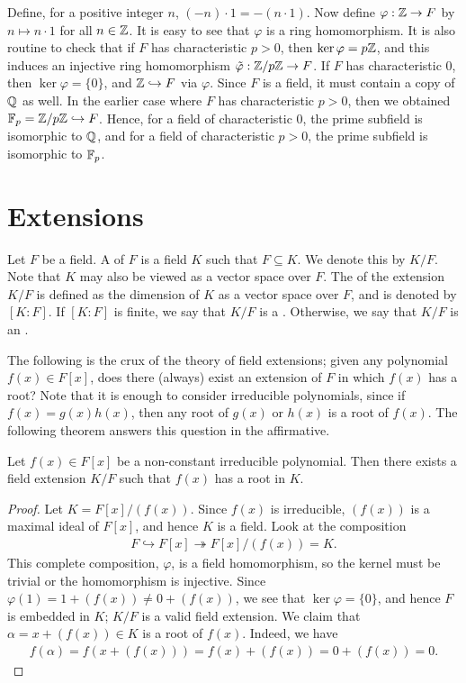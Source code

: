 Define, for a positive integer $n$, $(-n) \cdot 1 = - (n \cdot 1)$. Now define $\varphi:\mathbb{Z} \to F$ by $n \mapsto n \cdot 1$ for all $n \in \mathbb{Z}$. It is easy to see that $\varphi$ is a ring homomorphism. It is also routine to check that if $F$ has characteristic $p>0$, then $\ker \varphi = p\mathbb{Z}$, and this induces an injective ring homomorphism $\tilde{\varphi}:\mathbb{Z}/p\mathbb{Z} \to F$. If $F$ has characteristic $0$, then $\ker \varphi = \{0\}$, and $\mathbb{Z} \hookrightarrow F$ via $\varphi$. Since $F$ is a field, it must contain a copy of $\mathbb{Q}$ as well. In the earlier case where $F$ has characteristic $p>0$, then we obtained $\mathbb{F}_{p} = \mathbb{Z}/p\mathbb{Z} \hookrightarrow F$. Hence, for a field of characteristic $0$, the prime subfield is isomorphic to $\mathbb{Q}$, and for a field of characteristic $p>0$, the prime subfield is isomorphic to $\mathbb{F}_{p}$.

\section{Extensions}

Let $F$ be a field. A  of $F$ is a field $K$ such that $F \subseteq K$. We denote this by $K/F$. Note that $K$ may also be viewed as a vector space over $F$. The  of the extension $K/F$ is defined as the dimension of $K$ as a vector space over $F$, and is denoted by $[K:F]$. If $[K:F]$ is finite, we say that $K/F$ is a . Otherwise, we say that $K/F$ is an .

The following is the crux of the theory of field extensions; given any polynomial $f(x) \in F[x]$, does there (always) exist an extension of $F$ in which $f(x)$ has a root? Note that it is enough to consider irreducible polynomials, since if $f(x) = g(x)h(x)$, then any root of $g(x)$ or $h(x)$ is a root of $f(x)$. The following theorem answers this question in the affirmative.

\begin{theorem}
    Let $f(x) \in F[x]$ be a non-constant irreducible polynomial. Then there exists a field extension $K/F$ such that $f(x)$ has a root in $K$.
\end{theorem}
\begin{proof}
    Let $K = F[x]/(f(x))$. Since $f(x)$ is irreducible, $(f(x))$ is a maximal ideal of $F[x]$, and hence $K$ is a field. Look at the composition
    \begin{align}
        F \hookrightarrow F[x] \twoheadrightarrow F[x]/(f(x)) = K.
    \end{align}
    This complete composition, $\varphi$, is a field homomorphism, so the kernel must be trivial or the homomorphism is injective. Since $\varphi(1) = 1+(f(x)) \neq 0+(f(x))$, we see that $\ker \varphi = \{0\}$, and hence $F$ is embedded in $K$; $K/F$ is a valid field extension. We claim that $\alpha = x+(f(x)) \in K$ is a root of $f(x)$. Indeed, we have
    \begin{align}
        f(\alpha) = f(x+(f(x))) = f(x) + (f(x)) = 0 + (f(x)) = 0.
    \end{align}
\end{proof}


